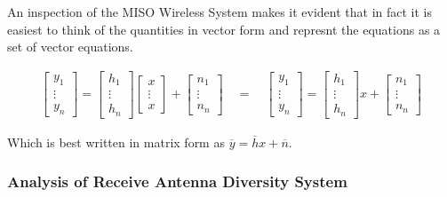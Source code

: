                An inspection of the MISO Wireless System makes it
               evident that in fact it is easiest to think of the
               quantities in vector form and represnt the equations as a
               set of vector equations.

               \begin{center}
               \begin{align}
                  \begin{bmatrix} y_1\\ \vdots\\ y_n \end{bmatrix}
                  =\begin{bmatrix} h_1\\ \vdots\\ h_n \end{bmatrix}
                   \begin{bmatrix} x\\ \vdots\\ x \end{bmatrix}
                  +\begin{bmatrix} n_1\\ \vdots\\ n_n \end{bmatrix}
                  \quad = \quad
                  \begin{bmatrix} y_1\\ \vdots\\ y_n \end{bmatrix}
                  =\begin{bmatrix} h_1\\ \vdots\\ h_n \end{bmatrix}
                   x
                  +\begin{bmatrix} n_1\\ \vdots\\ n_n \end{bmatrix}
               \end{align}
               \end{center}

               \vspace{10pt}
               Which is best written in matrix form as
               $\overline{y}=\overline{h}x+\overline{n}$.

               \subsubsection{Analysis of Receive Antenna Diversity System}

